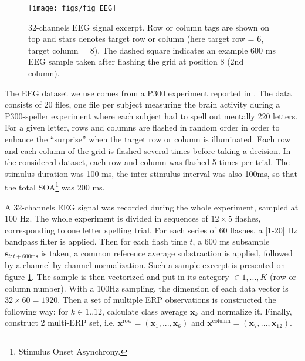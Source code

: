 \documentclass[conference]{IEEEtran}
\begin{document}
\begin{figure}
\centerline{
 \texttt{[image: figs/fig\_EEG]}
}
\caption{32-channels EEG signal excerpt. 
Row or column tags are shown on top and stars denotes target row or column (here target row = 6, target column = 8).
The dashed square indicates an example 600 ms EEG sample taken after flashing the grid at position 8 (2nd column).}
\label{fig:EEG}
\end{figure}

The EEG dataset we use comes from a P300 experiment reported in \cite{Maby10}. 
The data consists of 20 files, one file per subject
measuring the brain activity during a P300-speller
experiment where
each subject had to spell out mentally 220 letters. 
For a given letter, rows and columns are flashed in random order
in order to enhance the ``surprise'' when the target row or column
is illuminated.
Each row and each column of the grid 
is flashed several times before taking a decision.
In the considered dataset, each row and column was flashed 5 times per trial.
The stimulus duration was 100 ms, the inter-stimulus interval was also 100ms,
so that the total SOA\footnote{Stimulus Onset Asynchrony.} was 200 ms.

A 32-channels EEG signal was recorded during the whole experiment, sampled at 100 Hz.
The whole experiment is divided in sequences of $12 \times 5$  flashes, corresponding to one letter spelling trial.
For each series of 60 flashes,  a [1-20] Hz bandpass filter is applied.
Then for each flash time $t$, a 600 ms subsample $\mathbf{s}_{t:t+600 \text{ms}}$ is taken, 
a common reference average substraction is applied, followed by a channel-by-channel normalization.
Such a sample excerpt is presented on figure \ref{fig:EEG}.
The sample is then vectorized and put in its category $\in {1,...,K}$ (row or column number).
With a 100Hz sampling, the dimension of each  data vector is $32 \times 60 = 1920$.
Then a set of multiple ERP observations is constructed the following way:
for $k \in 1..12$, calculate class average $\boldsymbol{x}_k$ and normalize it.
Finally, construct 2 multi-ERP set, i.e. $\underline{\mathbf{x}}^\text{row} = (\boldsymbol{x}_1,...,\boldsymbol{x}_6)$ 
and $\underline{\mathbf{x}}^\text{column} = (\boldsymbol{x}_7,...,\boldsymbol{x}_{12})$.
\end{document}
